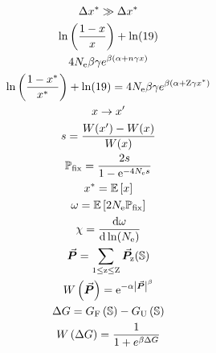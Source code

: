 \documentclass{article}
\begin{document}
\begin{gather*}
\Delta  x^{*} \gg \Delta  x^{*} \\
\ln \left( \frac{1 - x}{x} \right) + \ln (19) \\
4N_{\textrm{e}} \beta \gamma e^{\beta (\alpha + n \gamma x)}\\
\ln \left( \frac{1 - x^{*}}{x^{*}} \right) + \ln (19) = 4N_{\textrm{e}} \beta \gamma e^{\beta (\alpha + \text{Z} \gamma x^{*})}\\
x \rightarrow x' \\
s = \frac{W(x') - W(x)}{W( x)} \\
\mathbb{P}_{\mathrm{fix}} = \frac{ 2 s}{1 - \mathrm{e}^{-4N_{\textrm{e}} s}} \\
x^{*} = \operatorname{\mathbb{E}} \left[ x \right] \\
\omega = \operatorname{\mathbb{E}} \left[ 2 N_{\textrm{e}} \mathbb{P}_{\mathrm{fix}} \right]\\
\chi = \frac{ \mathrm{d} \omega}{\mathrm{d} \ln (N_{\textrm{e}})} \\
\vec{\bm{P}} = \sum\limits_{1 \leq \text{z} \leq \text{Z}} \vec{\bm{P}}_{\text{z}}(\mathbb{S}) \\
W\left( \vec{\bm{P}} \right) = \mathrm{e}^{-\alpha \left| \vec{\bm{P}} \right|^{\beta}}\\
\Delta G = G_{\textrm{F}} \left(\mathbb{S}\right) - G_{\textrm{U}} \left(\mathbb{S}\right) \\
W\left( \Delta G \right) = \dfrac{1}{1 + e^{\beta \Delta G }}\\
\end{gather*}
\end{document}
